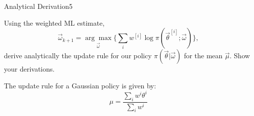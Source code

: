 \begin{questions}


\begin{question}{Analytical Derivation}{5}

Using the weighted ML estimate,
\begin{equation}
    \vec{\omega}_{k+1} = \underset{\vec \omega}{\arg\max} \{ \sum_i w^{[i]} \log \pi(\vec{\theta}^{[i]};\vec{\omega})\},
\end{equation}
derive analytically the update rule for our policy $\pi(\vec{\theta}|\vec{\omega})$ for the mean $\vec{\mu}$. Show your derivations.

\begin{answer}
	The update rule for a Gaussian policy is given by:\\
	\begin{equation}
		\mu = \frac{\sum\nolimits_{i}^{} w^{i} \theta^{i}}{\sum\nolimits_{i}^{} w^{i}}
	\end{equation}
\end{answer}

\end{question}




\end{questions}

